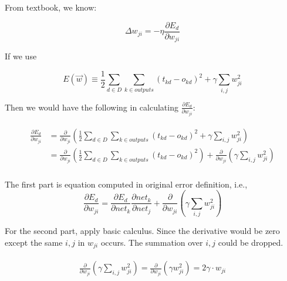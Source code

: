\documentclass[preview]{standalone}
\begin{document}
\section{}

\subsection{}

From textbook, we know:

\[\Delta w_{ji} = -\eta\frac{\partial E_d}{\partial w_{ji}}\]

If we use 

\[E(\vec{w})\equiv\frac{1}{2}\sum_{d\in{D}}\sum_{{k\in{outputs}}}(t_{{kd}}-o_{{kd}})^2+\gamma\sum_{i,j}w_{ji}^2\]

Then we would have the following in calculating
$\displaystyle\frac{\partial E_d}{\partial w_{ji}}$:

\begin{align}
\begin{split}
\frac{\partial E_d}{\partial w_{ji}}
&= \frac{\partial}{\partial w_{ji}}\left(\frac{1}{2}\sum_{d\in{D}}\sum_{{k\in{outputs}}}(t_{{kd}}-o_{{kd}})^2+\gamma\sum_{i,j}w_{ji}^2 \right)\\
&=
\frac{\partial}{\partial w_{ji}}\left(\frac{1}{2}\sum_{d\in{D}}\sum_{{k\in{outputs}}}(t_{{kd}}-o_{{kd}})^2\right)
+
\frac{\partial}{\partial w_{ji}}\left(\gamma\sum_{i,j}w_{ji}^2 \right)\\
\end{split}
\end{align}

The first part is equation computed in original error definition, i.e.,
\[\frac{\partial E_d}{\partial w_{ji}}
= \frac{\partial E_d}{\partial net_{{k}}}\frac{\partial net_{{k}}}{\partial
net_{j}}
+
\frac{\partial}{\partial w_{ji}}\left(\gamma\sum_{i,j}w_{ji}^2 \right)\]

For the second part, apply basic calculus. Since the derivative would be zero
except the same $i,j$ in $w_{ji}$ occurs. The summation over $i,j$ could be
dropped.

\begin{align}
\begin{split}
\frac{\partial}{\partial w_{ji}}\left(\gamma\sum_{i,j}w_{ji}^2 \right)
= \frac{\partial}{\partial w_{ji}}\left(\gamma w_{ji}^2 \right)
= 2 \gamma \cdot w_{ji}
\end{split}
\end{align}
\end{document}
